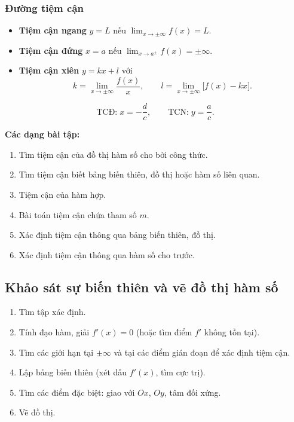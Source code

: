 \documentclass[12pt,a4paper]{article}
\begin{document}
\subsubsection{Đường tiệm cận}

\begin{dinhnghia}
  \begin{itemize}
    \item \textbf{Tiệm cận ngang} $y = L$\; nếu $\displaystyle\lim_{x \to \pm\infty} f(x) = L$.
    \item \textbf{Tiệm cận đứng} $x = a$\; nếu $\displaystyle\lim_{x \to a^{\pm}} f(x) = \pm\infty$.
    \item \textbf{Tiệm cận xiên} $y = kx + l$ với
      \[
        k = \lim_{x \to \pm\infty} \dfrac{f(x)}{x}, \qquad
        l = \lim_{x \to \pm\infty} \bigl[f(x) - kx\bigr].
      \]
  \end{itemize}
\end{dinhnghia}

\begin{congthuc}[title={Hàm phân thức $y = \dfrac{ax + b}{cx + d}$ \;$(c \ne 0,\; ad - bc \ne 0)$}]
  \[
    \text{TCĐ:}\; x = -\dfrac{d}{c}, \qquad
    \text{TCN:}\; y = \dfrac{a}{c}.
  \]
\end{congthuc}

\medskip\noindent\textbf{Các dạng bài tập:}
\begin{enumerate}[label=\textbf{Dạng \arabic*:}, leftmargin=*, align=left]
  \item Tìm tiệm cận của đồ thị hàm số cho bởi công thức.
  \item Tìm tiệm cận biết bảng biến thiên, đồ thị hoặc hàm số liên quan.
  \item Tiệm cận của hàm hợp.
  \item Bài toán tiệm cận chứa tham số $m$.
  \item Xác định tiệm cận thông qua bảng biến thiên, đồ thị.
  \item Xác định tiệm cận thông qua hàm số cho trước.
\end{enumerate}

\subsection{Khảo sát sự biến thiên và vẽ đồ thị hàm số}

\begin{phuongphap}[title={Sơ đồ khảo sát hàm số}]
  \begin{enumerate}
    \item Tìm tập xác định.
    \item Tính đạo hàm, giải $f'(x) = 0$ (hoặc tìm điểm $f'$ không tồn tại).
    \item Tìm các giới hạn tại $\pm\infty$ và tại các điểm gián đoạn để xác định tiệm cận.
    \item Lập bảng biến thiên (xét dấu $f'(x)$, tìm cực trị).
    \item Tìm các điểm đặc biệt: giao với $Ox$, $Oy$, tâm đối xứng.
    \item Vẽ đồ thị.
  \end{enumerate}
\end{phuongphap}
\end{document}
